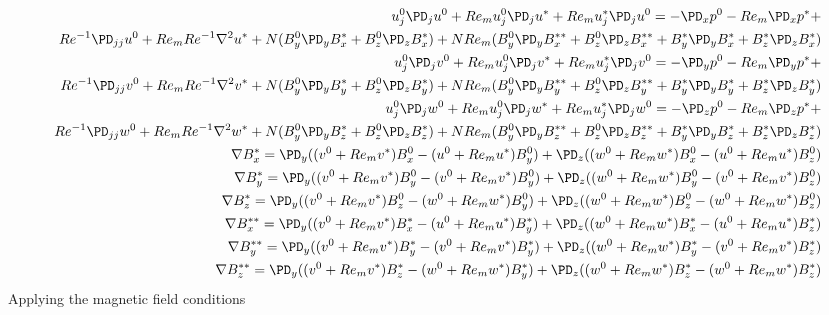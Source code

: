 \documentclass[11pt]{article}
\begin{document}
\begin{equation}\begin{aligned}
u_j^0 \PD_j u^0 + Re_m u_j^0 \PD_j u^* + Re_m u_j^* \PD_j u^0 = -\PD_x p^0 - Re_m\PD_x p^*+ \\ Re^{-1} \PD_{jj} u^0 + Re_m Re^{-1} \nabla^2 u^* + N (B_y^0 \PD_y B_x^* + B_z^0 \PD_z B_x^*) + N Re_m ( B_y^0 \PD_y B_x^{**} + B_z^0 \PD_z B_x^{**} + B_y^* \PD_y B_x^* + B_z^* \PD_z B_x^* ) \\
u_j^0 \PD_j v^0 + Re_m u_j^0 \PD_j v^* + Re_m u_j^* \PD_j v^0 = -\PD_y p^0 - Re_m\PD_y p^*+ \\ Re^{-1} \PD_{jj} v^0 + Re_m Re^{-1} \nabla^2 v^* + N (B_y^0 \PD_y B_y^* + B_z^0 \PD_z B_y^*) + N Re_m ( B_y^0 \PD_y B_y^{**} + B_z^0 \PD_z B_y^{**} + B_y^* \PD_y B_y^* + B_z^* \PD_z B_y^* ) \\
u_j^0 \PD_j w^0 + Re_m u_j^0 \PD_j w^* + Re_m u_j^* \PD_j w^0 = -\PD_z p^0 - Re_m\PD_z p^*+ \\ Re^{-1} \PD_{jj} w^0 + Re_m Re^{-1} \nabla^2 w^* + N (B_y^0 \PD_y B_z^* + B_z^0 \PD_z B_z^*) + N Re_m ( B_y^0 \PD_y B_z^{**} + B_z^0 \PD_z B_z^{**} + B_y^* \PD_y B_z^* + B_z^* \PD_z B_z^* ) \\
\nabla B_x^{*}  = \PD_y ((v^0+Re_m v^*) B_x^{0} - (u^0+Re_m u^*) B_y^{0}) + \PD_z ((w^0+Re_m w^*) B_x^{0} - (u^0+Re_m u^*) B_z^{0}) \\
\nabla B_y^{*}  = \PD_y ((v^0+Re_m v^*) B_y^{0} - (v^0+Re_m v^*) B_y^{0}) + \PD_z ((w^0+Re_m w^*) B_y^{0} - (v^0+Re_m v^*) B_z^{0}) \\
\nabla B_z^{*}  = \PD_y ((v^0+Re_m v^*) B_z^{0} - (w^0+Re_m w^*) B_y^{0}) + \PD_z ((w^0+Re_m w^*) B_z^{0} - (w^0+Re_m w^*) B_z^{0}) \\
\nabla B_x^{**} = \PD_y ((v^0+Re_m v^*) B_x^{*} - (u^0+Re_m u^*) B_y^{*}) + \PD_z ((w^0+Re_m w^*) B_x^{*} - (u^0+Re_m u^*) B_z^{*}) \\
\nabla B_y^{**} = \PD_y ((v^0+Re_m v^*) B_y^{*} - (v^0+Re_m v^*) B_y^{*}) + \PD_z ((w^0+Re_m w^*) B_y^{*} - (v^0+Re_m v^*) B_z^{*}) \\
\nabla B_z^{**} = \PD_y ((v^0+Re_m v^*) B_z^{*} - (w^0+Re_m w^*) B_y^{*}) + \PD_z ((w^0+Re_m w^*) B_z^{*} - (w^0+Re_m w^*) B_z^{*}) \\
\end{aligned}\end{equation}
Applying the magnetic field conditions
\end{document}
